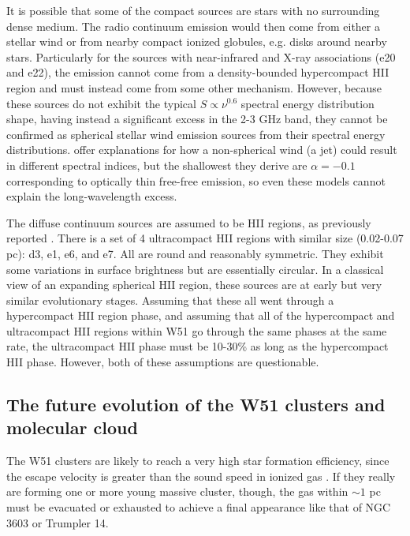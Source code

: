 It is possible that some of the compact sources are stars with no surrounding
dense medium.  The radio continuum emission would then come from either a
stellar wind \citep{Gaume1993a} or from nearby compact ionized globules, e.g.
disks around nearby stars.  Particularly for the sources with near-infrared and
X-ray associations (e20 and e22), the emission cannot come from a
density-bounded hypercompact HII region and must instead come from some other
mechanism.  However, because these sources do not exhibit the typical
$S\propto\nu^{0.6}$ spectral energy distribution shape, having instead a
significant excess in the 2-3 GHz band, they cannot be confirmed as
spherical stellar wind emission sources from their spectral energy distributions.
\citet{Reynolds1986a} offer explanations for how a non-spherical wind (a jet)
could result in different spectral indices, but the shallowest they derive
are $\alpha=-0.1$ corresponding to optically thin free-free emission, so even
these models cannot explain the long-wavelength excess.

The diffuse continuum sources are assumed to be HII regions, as previously
reported \citep{Gaume1993a,Mehringer1994a}.  There is a set of 4 ultracompact
HII regions with similar size (0.02-0.07 pc): d3, e1, e6, and e7.  All are
round and reasonably symmetric.  They exhibit some variations in surface
brightness but are essentially circular.  In a classical view of an expanding
spherical HII region, these sources are at early but very similar evolutionary
stages.  Assuming that these all went through a hypercompact HII region phase,
and assuming that all of the hypercompact and ultracompact HII regions within
W51 go through the same phases at the same rate, the ultracompact HII phase
must be 10-30\% as long as the hypercompact HII phase.  However, both of these
assumptions are questionable.



\subsection{The future evolution of the W51 clusters and molecular cloud}
The W51 clusters are likely to reach a very high star formation efficiency,
since the escape velocity is greater than the sound speed in ionized gas
\citep{Ginsburg2012a,Bressert2012a}.  If they really are forming one or more
young massive cluster, though, the gas within $\sim 1$ pc must be evacuated or
exhausted to achieve a final appearance like that of NGC 3603 or Trumpler 14.

